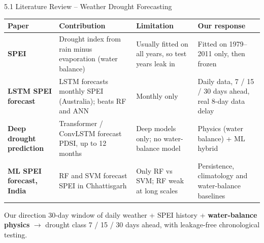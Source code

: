 \documentclass[aspectratio=169,10pt]{beamer}
\begin{document}
\begin{frame}{5.1 Literature Review -- Weather Drought Forecasting}
\vspace{1mm}
\footnotesize
\renewcommand{\arraystretch}{1.2}\setlength{\tabcolsep}{5pt}
\begin{tabularx}{\textwidth}{|>{\raggedright\arraybackslash}p{3.2cm}|Y|Y|Y|}
\hline
\textbf{Paper} & \textbf{Contribution} & \textbf{Limitation} & \textbf{Our response} \\ \hline
\textbf{SPEI}  & Drought index from rain minus evaporation (water balance) & Usually fitted on all years, so test years leak in & Fitted on 1979--2011 only, then frozen \\ \hline
\textbf{LSTM SPEI forecast}  & LSTM forecasts monthly SPEI (Australia); beats RF and ANN & Monthly only & Daily data, 7 / 15 / 30 days ahead, real 8-day data delay \\ \hline
\textbf{Deep drought prediction}  & Transformer / ConvLSTM forecast PDSI, up to 12 months & Deep models only; no water-balance model & Physics (water balance) + ML hybrid \\ \hline
\textbf{ML SPEI forecast, India}  & RF and SVM forecast SPEI in Chhattisgarh & Only RF vs SVM; RF weak at long scales & Persistence, climatology and water-balance baselines \\ \hline
\end{tabularx}
\vspace{1mm}
\begin{card}{Our direction}
\footnotesize 30-day window of daily weather + SPEI history + \textbf{water-balance physics} $\rightarrow$ drought class 7 / 15 / 30 days ahead, with leakage-free chronological testing.
\end{card}
\end{frame}
\end{document}
